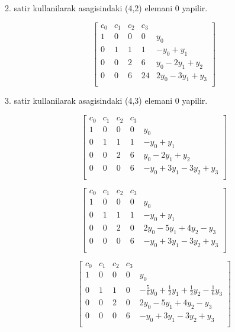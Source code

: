 \documentclass{article}
\begin{document}
2. satir kullanilarak  asagisindaki (4,2) elemani 0 yapilir.\begin{center}
$$ \left[\begin{array}{rrrr|r}
c_{0} & c_{1} & c_{2} & c_{3}\\
1 & 0 & 0 & 0 & y_{0}\\
0 & 1 & 1 & 1 & -y_{0}+y_{1}\\
0 & 0 & 2 & 6 & y_{0}-2y_{1}+y_{2}\\
0 & 0 & 6 & 24 & 2y_{0}-3y_{1}+y_{3}\\
\end{array}\right] $$
\end{center}
3. satir kullanilarak  asagisindaki (4,3) elemani 0 yapilir.\begin{center}
$$ \left[\begin{array}{rrrr|r}
c_{0} & c_{1} & c_{2} & c_{3}\\
1 & 0 & 0 & 0 & y_{0}\\
0 & 1 & 1 & 1 & -y_{0}+y_{1}\\
0 & 0 & 2 & 6 & y_{0}-2y_{1}+y_{2}\\
0 & 0 & 0 & 6 & -y_{0}+3y_{1}-3y_{2}+y_{3}\\
\end{array}\right] $$
\end{center}
\begin{center}
$$ \left[\begin{array}{rrrr|r}
c_{0} & c_{1} & c_{2} & c_{3}\\
1 & 0 & 0 & 0 & y_{0}\\
0 & 1 & 1 & 1 & -y_{0}+y_{1}\\
0 & 0 & 2 & 0 & 2y_{0}-5y_{1}+4y_{2}-y_{3}\\
0 & 0 & 0 & 6 & -y_{0}+3y_{1}-3y_{2}+y_{3}\\
\end{array}\right] $$
\end{center}
\begin{center}
$$ \left[\begin{array}{rrrr|r}
c_{0} & c_{1} & c_{2} & c_{3}\\
1 & 0 & 0 & 0 & y_{0}\\
0 & 1 & 1 & 0 & -\frac{5}{6}y_{0}+\frac{1}{2}y_{1}+\frac{1}{2}y_{2}-\frac{1}{6}y_{3}\\
0 & 0 & 2 & 0 & 2y_{0}-5y_{1}+4y_{2}-y_{3}\\
0 & 0 & 0 & 6 & -y_{0}+3y_{1}-3y_{2}+y_{3}\\
\end{array}\right] $$
\end{center}
\end{document}
